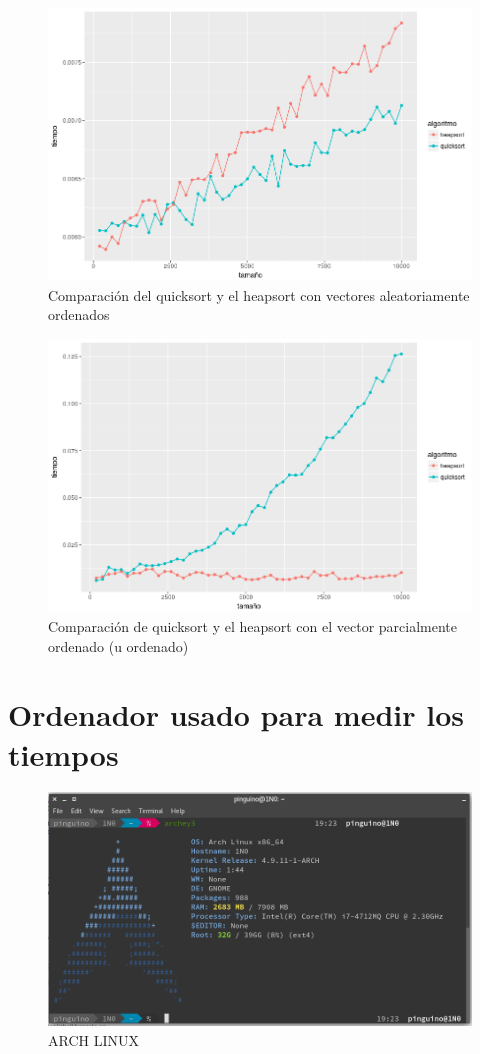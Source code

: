 \documentclass[a4paper, 11pt]{article}
\begin{document}
\begin{figure}[!hbp]
	\includegraphics[width=\textwidth]{NOordenadosquickheap.png}
	\caption{Comparación del quicksort y el heapsort con vectores aleatoriamente ordenados\label{ref1}}
\end{figure}

\begin{figure}[!hbp]
	\includegraphics[width=\textwidth]{heapsort_quicksort_ordenados.png}
	\caption{Comparación de quicksort y el heapsort con el vector parcialmente ordenado (u ordenado) \label{ref2}}
\end{figure}

\pagebreak
\section{Ordenador usado para medir los tiempos}

\begin{figure}[!hbp]
	\includegraphics[width=\textwidth]{arch.png}
	\caption{ARCH LINUX\label{arch}}
\end{figure}
\end{document}
